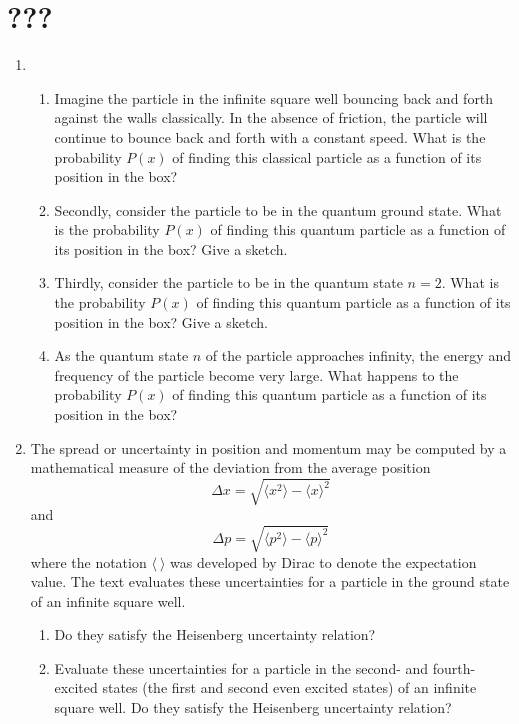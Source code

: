 \documentclass[../psets.tex]{subfiles}
\begin{document}
\section{???}
\begin{enumerate}
    \item {}
    \vspace{-2em}
    \begin{enumerate}
        \item Imagine the particle in the infinite square well bouncing back and forth against the walls classically. In the absence of friction, the particle will continue to bounce back and forth with a constant speed. What is the probability $P(x)$ of finding this classical particle as a function of its position in the box?
        \item Secondly, consider the particle to be in the quantum ground state. What is the probability $P(x)$ of finding this quantum particle as a function of its position in the box? Give a sketch.
        \item Thirdly, consider the particle to be in the quantum state $n=2$. What is the probability $P(x)$ of finding this quantum particle as a function of its position in the box? Give a sketch.
        \item As the quantum state $n$ of the particle approaches infinity, the energy and frequency of the particle become very large. What happens to the probability $P(x)$ of finding this quantum particle as a function of its position in the box?
    \end{enumerate}
    \item The spread or uncertainty in position and momentum may be computed by a mathematical measure of the deviation from the average position
    \begin{equation}
        \Delta x = \sqrt{\langle x^2\rangle-\langle x\rangle^2}
    \end{equation}
    and
    \begin{equation}
        \Delta p = \sqrt{\langle p^2\rangle-\langle p\rangle^2}
    \end{equation}
    where the notation $\langle\ \rangle$ was developed by Dirac to denote the expectation value. The text evaluates these uncertainties for a particle in the ground state of an infinite square well.
    \begin{enumerate}
        \item Do they satisfy the Heisenberg uncertainty relation?
        \item Evaluate these uncertainties for a particle in the second- and fourth-excited states (the first and second even excited states) of an infinite square well. Do they satisfy the Heisenberg uncertainty relation?

\end{enumerate}
\end{enumerate}
\end{document}

